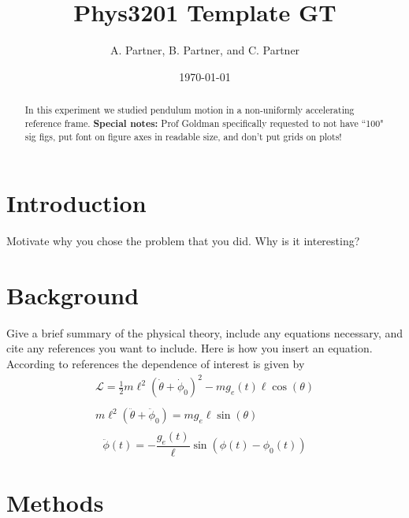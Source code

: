 



\title{Phys3201 Template GT}
\author{A. Partner, B. Partner, and C. Partner}
\date{\today}
\maketitle

\begin{abstract}
  In this experiment we studied pendulum motion in a non-uniformly accelerating reference frame. \textbf{Special notes:} Prof Goldman specifically requested to not have ``100" sig figs, put font on figure axes in readable size, and don't put grids on plots!
\end{abstract}


\section{Introduction}

Motivate why you chose the problem that you did. Why is it interesting?

\blindtext %


\section{Background}

Give a brief summary of the physical theory, include any equations necessary, and cite any references you want to include. Here is how you insert an equation. According to
references the dependence of interest is given
by
\begin{gather*}
  \mathcal{L} =  \frac{1}{2} m \ell^2 ( \dot{\theta}+\dot{\phi}_0)^2 - m g_e(t) \ell \cos(\theta)\\
  \\
  m\ell^2 (\ddot{\theta} + \ddot{\phi}_0) = mg_e\ell\sin(\theta)\\
\end{gather*}
\begin{equation}
  \ddot{\phi}(t) = -\frac{g_e(t)}{\ell} \sin\left(\phi(t)-\phi_0(t)\right)
  \label{Eq:equation1} %
\end{equation}

\blindtext %

\section{Methods}



